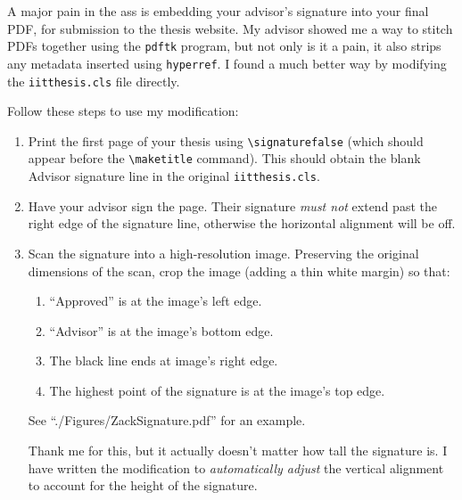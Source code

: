 \documentclass{iitthesis}
\begin{document}


A major pain in the ass is embedding your advisor's signature into your final PDF, 
for submission to the thesis website. My advisor showed me a way to 
stitch PDFs together using the {\tt pdftk} program, but not only is it a pain, 
it also strips any metadata inserted using {\tt hyperref}.
I found a much better way by modifying the {\tt iitthesis.cls} file directly.

Follow these steps to use my modification:
\begin{enumerate}
	\item Print the first page of your thesis using \verb|\signaturefalse|
	(which should appear before the \verb|\maketitle| command).
	This should obtain the blank Advisor signature line in the original {\tt iitthesis.cls}.
	
	\item Have your advisor sign the page. Their signature \emph{must not} extend
	past the right edge of the signature line, 
	otherwise the horizontal alignment will be off.
	
	\item Scan the signature into a high-resolution image. 
	Preserving the original dimensions of the scan,
	crop the image (adding a thin white margin) so that:
	\begin{enumerate}
	
		\item ``Approved'' is at the image's left edge.
		
		\item ``Advisor'' is at the image's bottom edge.
		
		\item The black line ends at image's right edge.
		
		\item The highest point of the signature is at the image's top edge.
		
	\end{enumerate}
	See ``./Figures/ZackSignature.pdf'' for an example.
	
	Thank me for this, but it actually doesn't matter how tall the signature is.
	I have written the modification to \emph{automatically adjust} 
	the vertical alignment to account for the height of the signature.	
	

\end{enumerate}
\end{document}
